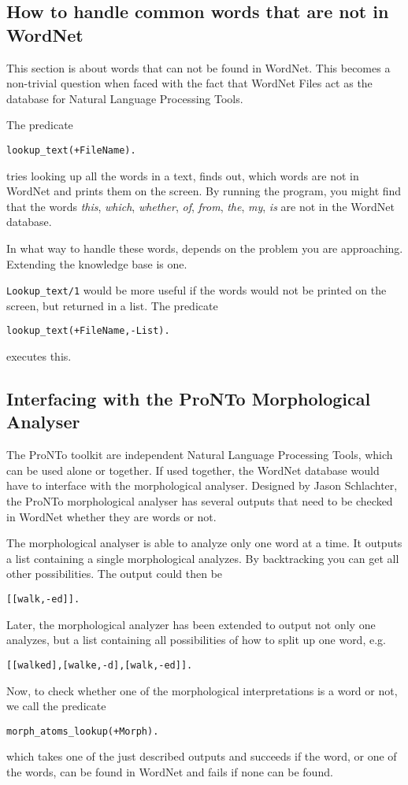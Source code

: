 \documentclass[12pt]{article}
\begin{document}
\subsection{How to handle common words that are not in WordNet}

This section is about words that can not be found in WordNet. This becomes a non-trivial question when faced with the fact
that WordNet Files act as the database for Natural Language Processing Tools.

The predicate
\begin{verbatim}
lookup_text(+FileName).
\end{verbatim}
tries looking up all the words in a text, finds out, which words are not in WordNet and prints them on the screen. By running the
program, you might find that the words \emph{this}, \emph{which}, \emph{whether}, \emph{of}, \emph{from}, \emph{the},
\emph{my}, \emph{is} are not in the WordNet database.

In what way to handle these words, depends on the problem you are approaching. Extending the knowledge base is one.

{\tt Lookup\_text/1} would be more useful if the words would not be printed on the screen, but returned
in a list. The predicate

\begin{verbatim}
lookup_text(+FileName,-List).
\end{verbatim}

executes this.

\subsection{Interfacing with the ProNTo Morphological Analyser}

The ProNTo toolkit are independent Natural Language Processing Tools, which can be used alone or together.
If used together, the WordNet database would have to interface with the morphological analyser. Designed
by Jason Schlachter, the ProNTo morphological analyser has several outputs that need to be
checked in WordNet whether they are words or not.

The morphological analyser is able to analyze only one word at a time. It outputs a list
containing a single morphological analyzes. By backtracking you can get all other possibilities. The output could then be
\begin{verbatim}
[[walk,-ed]].
\end{verbatim}
Later, the morphological analyzer has been extended to output not only one analyzes, but a list containing all possibilities
of how to split up one word, e.g.
\begin{verbatim}
[[walked],[walke,-d],[walk,-ed]].
\end{verbatim}
Now, to check whether one of the morphological interpretations is a word or not, we call the predicate
\begin{verbatim}
morph_atoms_lookup(+Morph).
\end{verbatim}
which takes one of the just described outputs and succeeds if the word, or one of the words, can be found in
WordNet and fails if none can be found.
\end{document}
